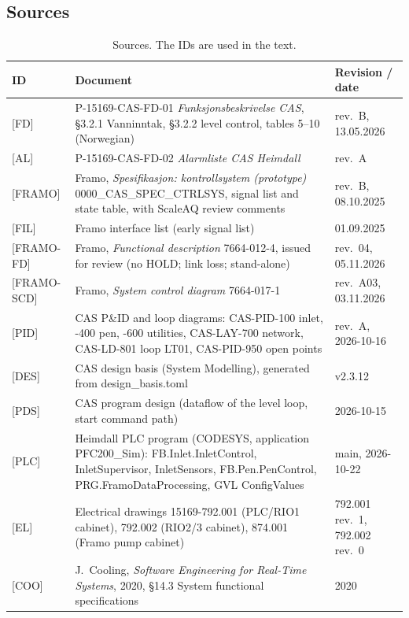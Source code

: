 \documentclass[11pt,a4paper]{article}
\begin{document}
\subsection{Sources}
\begin{table}[htbp]
\centering\small
\caption{Sources. The IDs are used in the text.}
\label{tab:sources}
\begin{tabularx}{\textwidth}{@{}P{17mm}LP{36mm}@{}}
\toprule
ID & Document & Revision / date \\
\midrule
{[FD]} & P-15169-CAS-FD-01 \emph{Funksjonsbeskrivelse CAS}, \S3.2.1 Vanninntak, \S3.2.2 level control,
  tables 5--10 (Norwegian) & rev.~B, 13.05.2026 \\
{[AL]} & P-15169-CAS-FD-02 \emph{Alarmliste CAS Heimdall} & rev.~A \\
{[FRAMO]} & Framo, \emph{Spesifikasjon: kontrollsystem (prototype)} 0000\_CAS\_SPEC\_CTRLSYS, signal list
  and state table, with ScaleAQ review comments & rev.~B, 08.10.2025 \\
{[FIL]} & Framo interface list (early signal list) & 01.09.2025 \\
{[FRAMO-FD]} & Framo, \emph{Functional description} 7664-012-4, issued for review (no HOLD; link loss; stand-alone) & rev.~04, 05.11.2026 \\
{[FRAMO-SCD]} & Framo, \emph{System control diagram} 7664-017-1 & rev.~A03, 03.11.2026 \\
{[PID]} & CAS P\&ID and loop diagrams: CAS-PID-100 inlet, -400 pen, -600 utilities, CAS-LAY-700
  network, CAS-LD-801 loop LT01, CAS-PID-950 open points & rev.~A, 2026-10-16 \\
{[DES]} & CAS design basis (System Modelling), generated from design\_basis.toml & v2.3.12 \\
{[PDS]} & CAS program design (dataflow of the level loop, start command path) & 2026-10-15 \\
{[PLC]} & Heimdall PLC program (CODESYS, application PFC200\_Sim): FB.Inlet.InletControl,
  InletSupervisor, InletSensors, FB.Pen.PenControl, PRG.FramoDataProcessing, GVL ConfigValues & main,
  2026-10-22 \\
{[EL]} & Electrical drawings 15169-792.001 (PLC/RIO1 cabinet), 792.002 (RIO2/3 cabinet),
  874.001 (Framo pump cabinet) & 792.001 rev.~1, 792.002 rev.~0 \\
{[COO]} & J.~Cooling, \emph{Software Engineering for Real-Time Systems}, 2020, \S14.3 System
  functional specifications & 2020 \\
\bottomrule
\end{tabularx}
\end{table}
\end{document}
